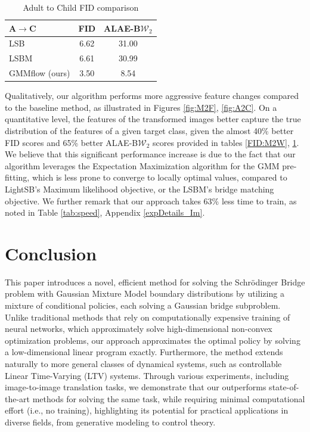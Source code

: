 \documentclass[twoside]{article}
\begin{document}
\begin{table} [!ht]
    \centering
    \begin{tabular}{l|cc}
          A$\rightarrow$C   & FID &  ALAE-B$\mathcal{W}_2$  \\
        \hline
        LSB                 &  6.62   &  31.00  \\
        LSBM                &  6.61   &  30.99  \\
        GMMflow (ours)      &  3.50   &  8.54   \\
    \end{tabular}
    \caption{Adult to Child FID comparison}
    \label{FID:A2C}
\end{table}

Qualitatively, our algorithm performs more aggressive feature changes compared to the baseline method, as illustrated in Figures \ref{fig:M2F}, \ref{fig:A2C}. 
On a quantitative level, the features of the transformed images better capture the true distribution of the features of a given target class, given the almost 40\% better FID scores and 65\% better ALAE-B$\mathcal{W}_2$ scores provided in tables \ref{FID:M2W}, \ref{FID:A2C}.
We believe that this significant performance increase is due to the fact that our algorithm leverages the Expectation Maximization algorithm for the GMM pre-fitting, which is less prone to converge to locally optimal values, compared to LightSB's Maximum likelihood objective, or the LSBM's bridge matching objective.
We further remark that our approach takes 63\% less time to train, as noted in Table \ref{tab:speed}, Appendix \ref{expDetails_Im}.

%
\section{Conclusion}
This paper introduces a novel, efficient method for solving the Schrödinger Bridge problem with Gaussian Mixture Model boundary distributions by utilizing a mixture of conditional policies, each solving a Gaussian bridge subproblem. 
Unlike traditional methods that rely on computationally expensive training of neural networks, which approximately solve high-dimensional non-convex optimization problems, our approach approximates the optimal policy by solving a low-dimensional linear program exactly.
Furthermore, the method extends naturally to more general classes of dynamical systems, such as controllable Linear Time-Varying (LTV) systems. 
Through various experiments, including image-to-image translation tasks, we demonstrate that our outperforms state-of-the-art methods for solving the same task, while requiring minimal computational effort (i.e., no training), highlighting its potential for practical applications in diverse fields, from generative modeling to control theory.
\end{document}
